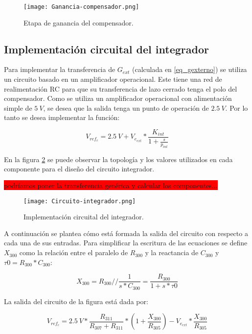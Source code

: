 \begin{figure}[H]
	\centering
	\texttt{[image: Ganancia-compensador.png]}
	\caption{Etapa de ganancia del compensador.}
	\label{fig:ganancia-compensador}
\end{figure}

\subsection{Implementación circuital del integrador}

Para implementar la transferencia de $G_{ext}$ (calculada en \ref{eq_gexterno}) se utiliza un circuito basado en un amplificador operacional. Este tiene una red de realimentación RC para que su transferencia de lazo cerrado tenga el polo del compensador. Como se utiliza un amplificador operacional con alimentación simple de $5\:V$, se desea que la salida tenga un punto de operación de $2.5\:V$. Por lo tanto se desea implementar la función:

\begin{equation}
	V_{ref_c}=2.5\:V+V_{e_{ext}}*\frac{K_{int}}{1+\frac{s}{p_{int}}}
\end{equation}
 
\noindent En la figura \ref{fig:circuito-integrador} se puede observar la topología y los valores utilizados en cada componente para el diseño del circuito integrador.

\colorbox{red}{podríamos poner la transferencia genérica y calcular los componentes...} 

\begin{figure}[H]
	\centering
	\texttt{[image: Circuito-integrador.png]}
	\caption{Implementación circuital del integrador.}
	\label{fig:circuito-integrador}
	\end{figure}

A continuación se plantea cómo está formada la salida del circuito con respecto a cada una de sus entradas. Para simplificar la escritura de las ecuaciones se define $X_{300}$ como la relación entre el paralelo de $R_{300}$ y la reactancia de $C_{300}$ y $\tau 0 = R_{300}*C_{300}$:

\begin{equation}
	X_{300} = R_{300} // \frac{1}{s*C_{300}} = \frac{R_{300}}{1+s*\tau 0}
\end{equation}

La salida del circuito de la figura está dada por:

\begin{equation} \label{eq_salida_integrador}
	V_{ref_c}=2.5\:V*\frac{R_{311}}{R_{307}+R_{311}}*(1+\frac{X_{300}}{R_{305}})-V_{e_{ext}}*\frac{X_{300}}{R_{305}}
\end{equation}

